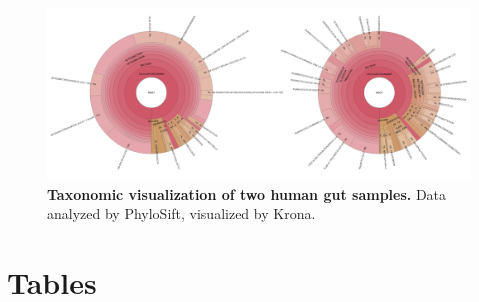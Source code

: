 \documentclass[10pt]{article}
\begin{document}
\begin{figure}[hp]
\begin{center}
\includegraphics[width=6.5in]{figures/krona_two.pdf}
\end{center}
\caption{\textbf{Taxonomic visualization of two human gut samples.} Data analyzed by PhyloSift, visualized by Krona.}
\label{fig:kronaplots}
\end{figure}

\clearpage

\section*{Tables}


\clearpage
\end{document}
